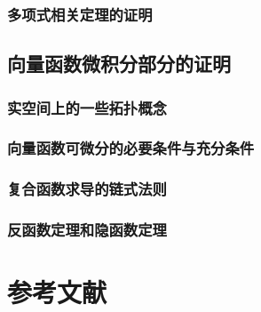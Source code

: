 \documentclass[
  zihao=5,
  a4paper,
  heading=true,
  twoside
]{ctexbook}
\theoremstyle{definition}
\theoremstyle{plain}
\begin{document}
\section{多项式相关定理的证明}\label{sec:A.5}


\chapter{向量函数微积分部分的证明}\label{sec:B}
\section{实空间上的一些拓扑概念}\label{sec:B.1}


\section{向量函数可微分的必要条件与充分条件}\label{sec:B.2}


\section{复合函数求导的链式法则}\label{sec:B.3}


\section{反函数定理和隐函数定理}\label{sec:B.4}


%

%
%

\newpage\part*{参考文献}
\printbibliography[heading=none]
\end{document}
